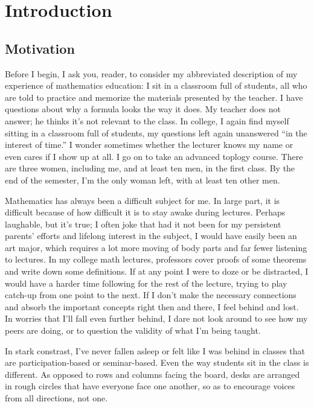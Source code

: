 \chapter{Introduction}
\section{Motivation}

Before I begin, I ask you, reader, to consider my abbreviated description of my experience of mathematics education: I sit in a classroom full of students, all who are told to practice and memorize the materials presented by the teacher. I have questions about why a formula looks the way it does. My teacher does not answer; he thinks it's not relevant to the class. In college, I again find myself sitting in a classroom full of students, my questions left again unanswered ``in the interest of time.'' I wonder sometimes whether the lecturer knows my name or even cares if I show up at all. I go on to take an advanced toplogy course. There are three women, including me, and at least ten men, in the first class. By the end of the semester, I'm the only woman left, with at least ten other men.

Mathematics has always been a difficult subject for me. In large part, it is difficult because of how difficult it is to stay awake during lectures. Perhaps laughable, but it's true; I often joke that had it not been for my persistent parents' efforts and lifelong interest in the subject, I would have easily been an art major, which requires a lot more moving of body parts and far fewer listening to lectures. In my college math lectures, professors cover proofs of some theorems and write down some definitions. If at any point I were to doze or be distracted, I would have a harder time following for the rest of the lecture, trying to play catch-up from one point to the next. If I don't make the necessary connections and absorb the important concepts right then and there, I feel behind and lost. In worries that I'll fall even further behind, I dare not look around to see how my peers are doing, or to question the validity of what I'm being taught.

In stark constrast, I've never fallen asleep or felt like I was behind in classes that are participation-based or seminar-based. Even the way students sit in the class is different. As opposed to rows and columns facing the board, desks are arranged in rough circles that have everyone face one another, so as to encourage voices from all directions, not one.

